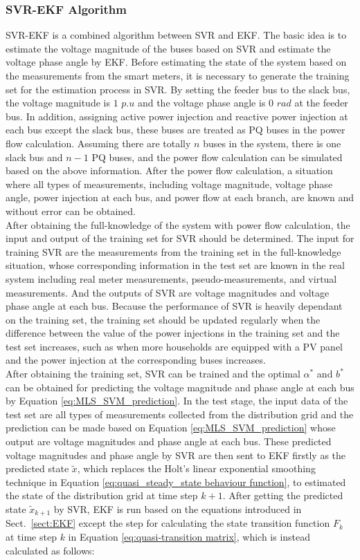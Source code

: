 \subsubsection{SVR-EKF Algorithm}
SVR-EKF is a combined algorithm between SVR and EKF. The basic idea is to estimate the voltage magnitude of the buses based on SVR and estimate the voltage phase angle by EKF. Before estimating the state of the system based on the measurements from the smart meters, it is necessary to generate the training set for the estimation process in SVR. By setting the feeder bus to the slack bus, the voltage magnitude is $1$ $p.u$ and the voltage phase angle is $0$ $rad$ at the feeder bus. In addition, assigning active power injection and reactive power injection at each bus except the slack bus, these buses are treated as PQ buses in the power flow calculation. Assuming there are totally $n$ buses in the system, there is one slack bus and $n-1$ PQ buses, and the power flow calculation can be simulated based on the above information. After the power flow calculation, a situation where all types of measurements, including voltage magnitude, voltage phase angle, power injection at each bus, and power flow at each branch, are known and without error can be obtained.
\bigskip
\\After obtaining the full-knowledge of the system with power flow calculation, the input and output of the training set for SVR should be determined. The input for training SVR are the measurements from the training set in the full-knowledge situation, whose corresponding information in the test set are known in the real system including real meter measurements, pseudo-measurements, and virtual measurements. And the outputs of SVR are voltage magnitudes and voltage phase angle at each bus. Because the performance of SVR is heavily dependant on the training set, the training set should be updated regularly when the difference between the value of the power injections in the training set and the test set increases, such as when more households are equipped with a PV panel and the power injection at the corresponding buses increases. 
\bigskip
\\After obtaining the training set, SVR can be trained and the optimal $\alpha^*$ and $b^*$ can be obtained for predicting the voltage magnitude and phase angle at each bus by Equation \ref{eq:MLS_SVM_prediction}. In the test stage, the input data of the test set are all types of measurements collected from the distribution grid and the prediction can be made based on Equation \ref{eq:MLS_SVM_prediction} whose output are voltage magnitudes and phase angle at each bus. These predicted voltage magnitudes and phase angle by SVR are then sent to EKF firstly as the predicted state $\widetilde{x}$, which replaces the Holt's linear exponential smoothing technique in Equation \ref{eq:quasi_steady_state behaviour function}, to estimated the state of the distribution grid at time step $k+1$. After getting the predicted state $\widetilde{x}_{k+1}$ by SVR, EKF is run based on the equations introduced in Sect.~\ref{sect:EKF} except the step for calculating the state transition function $F_k$ at time step $k$ in Equation \ref{eq:quasi-transition matrix}, which is instead calculated as follows:
